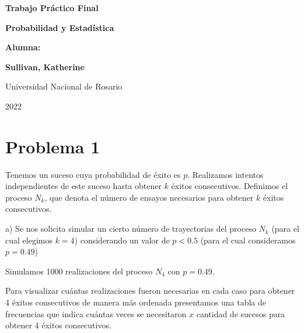 \documentclass[11pt]{article}
\begin{document}
\begin{titlepage}
    \begin{center}
        \vfill
        \vfill
            \vspace{0.7cm}
            \noindent\textbf{\Huge Trabajo Pr\'actico Final}\par
            \noindent\textbf{\Huge Probabilidad y Estad\'istica}\par
            \vspace{.5cm}
        \vfill
        \noindent \textbf{\huge Alumna:}\par
        \vspace{.5cm}
        \noindent \textbf{\Large Sullivan, Katherine}\par

 
        \vfill
        \large Universidad Nacional de Rosario \par
        \noindent\large 2022
    \end{center}
\end{titlepage}
\par

\section*{Problema 1}
Tenemos un suceso cuya probabilidad de éxito es $p$. Realizamos intentos independientes de este suceso hasta obtener $k$ éxitos consecutivos. 
Definimos el proceso $N_k$, que denota el número de ensayos necesarios para obtener $k$ éxitos consecutivos.

a) Se nos solicita simular un cierto número de trayectorias del proceso $N_k$ (para el cual elegimos $k=4$) considerando un valor de $p < 0.5$ (para el cual consideramos $p=0.49$)

Simulamos 1000 realizaciones del proceso $N_4$ con $p=0.49$.

Para visualizar cuántas realizaciones fueron necesarias en cada caso para obtener 4 éxitos consecutivos de manera más ordenada presentamos una tabla de frecuencias que indica cuántas veces se necesitaron $x$ cantidad de sucesos para obtener 4 éxitos consecutivos.
\end{document}
